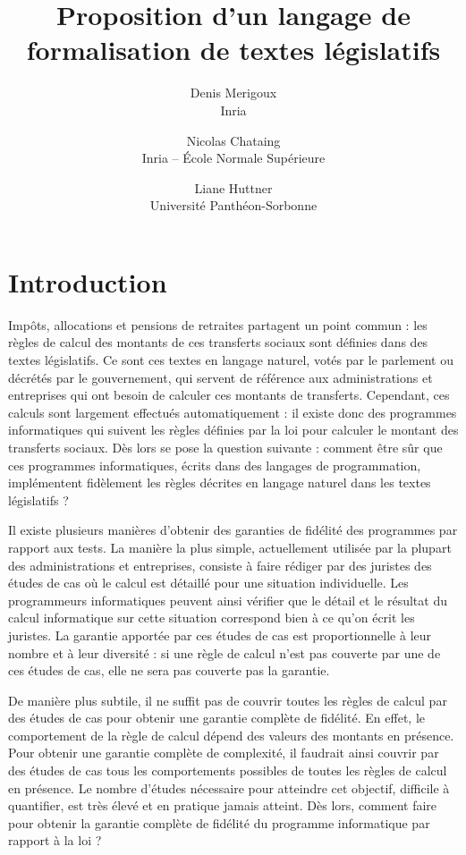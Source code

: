 \documentclass[11pt, french]{article}
\title{
  Proposition d'un langage de formalisation de textes législatifs
}
\author{
  Denis Merigoux\\Inria\and
  Nicolas Chataing\\Inria -- École Normale Supérieure\and
  Liane Huttner\\Université Panthéon-Sorbonne
}
\begin{document}
\maketitle

\section{Introduction}

Impôts, allocations et pensions de retraites partagent un point commun : les règles de calcul des
montants de ces transferts sociaux sont définies dans des textes législatifs. Ce sont ces textes
en langage naturel, votés par le parlement ou décrétés par le gouvernement, qui servent de référence
aux administrations et entreprises qui ont besoin de calculer ces montants de transferts. Cependant,
ces calculs sont largement effectués automatiquement : il existe donc des programmes informatiques
qui suivent les règles définies par la loi pour calculer le montant des transferts sociaux. Dès lors
se pose la question suivante : comment être sûr que ces programmes informatiques, écrits dans des
langages de programmation, implémentent fidèlement les règles décrites en langage naturel dans les
textes législatifs ?

Il existe plusieurs manières d'obtenir des garanties de fidélité des programmes par rapport aux
tests. La manière la plus simple, actuellement utilisée par la plupart des administrations et
entreprises, consiste à faire rédiger par des juristes des études de cas où le calcul est détaillé
pour une situation individuelle. Les programmeurs informatiques peuvent ainsi vérifier que le détail
et le résultat du calcul informatique sur cette situation correspond bien à ce qu'on écrit les
juristes. La garantie apportée par ces études de cas est proportionnelle à leur nombre et
à leur diversité : si une règle de calcul n'est pas couverte par une de ces études de cas, elle
ne sera pas couverte pas la garantie.

De manière plus subtile, il ne suffit pas de couvrir toutes
les règles de calcul par des études de cas pour obtenir une garantie complète de fidélité. En effet,
le comportement de la règle de calcul dépend des valeurs des montants en présence. Pour obtenir une
garantie complète de complexité, il faudrait ainsi couvrir par des études de cas tous les comportements
possibles de toutes les règles de calcul en présence. Le nombre d'études nécessaire pour atteindre
cet objectif, difficile à quantifier, est très élevé et en pratique jamais atteint. Dès lors,
comment faire pour obtenir la garantie complète de fidélité du programme informatique par rapport à
la loi ?
\end{document}
